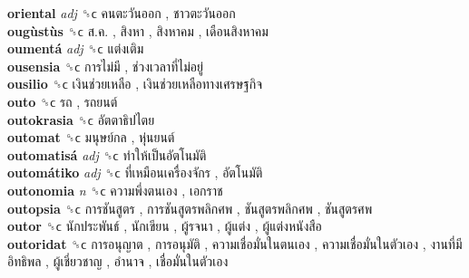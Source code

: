 \textbf{oriental} \emph{adj}  ␝ϲ   คนตะวันออก ,  ชาวตะวันออก   \\
\textbf{ougùstùs} ␝ϲ   ส.ค. ,  สิงหา ,  สิงหาคม ,  เดือนสิงหาคม   \\
\textbf{oumentá} \emph{adj}  ␝ϲ   แต่งเติม   \\
\textbf{ousensia} ␝ϲ   การไม่มี ,  ช่วงเวลาที่ไม่อยู่   \\
\textbf{ousilio} ␝ϲ   เงินช่วยเหลือ ,  เงินช่วยเหลือทางเศรษฐกิจ   \\
\textbf{outo} ␝ϲ   รถ ,  รถยนต์   \\
\textbf{outokrasia} ␝ϲ   อัตตาธิปไตย   \\
\textbf{outomat} ␝ϲ   มนุษย์กล ,  หุ่นยนต์   \\
\textbf{outomatisá} \emph{adj}  ␝ϲ   ทำให้เป็นอัตโนมัติ   \\
\textbf{outomátiko} \emph{adj}  ␝ϲ   ที่เหมือนเครื่องจักร ,  อัตโนมัติ   \\
\textbf{outonomia} \emph{n}  ␝ϲ   ความพึ่งตนเอง ,  เอกราช   \\
\textbf{outopsia} ␝ϲ   การชันสูตร ,  การชันสูตรพลิกศพ ,  ชันสูตรพลิกศพ ,  ชันสูตรศพ   \\
\textbf{outor} ␝ϲ   นักประพันธ์ ,  นักเขียน ,  ผู้รจนา ,  ผู้แต่ง ,  ผู้แต่งหนังสือ   \\
\textbf{outoridat} ␝ϲ   การอนุญาต ,  การอนุมัติ ,  ความเชื่อมั่นในตนเอง ,  ความเชื่อมั่นในตัวเอง ,  งานที่มีอิทธิพล ,  ผู้เชี่ยวชาญ ,  อำนาจ ,  เชื่อมั่นในตัวเอง   \\
